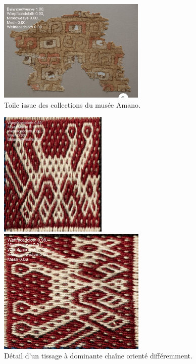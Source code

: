 \begin{figure}[!h]
	\begin{center}
		\includegraphics[width=7cm]{../images/AMANObalancedWeave.png}
		\caption{Toile issue des collections du musée Amano.}
	 \end{center}
\end{figure}

\clearpage

\begin{figure}[!h]
 \begin{minipage}[c]{.5\linewidth}
        \begin{center}
        		\includegraphics[height=6cm]{../images/weave1.jpg}
	\end{center}
    \end{minipage}
            \begin{minipage}[c]{.5\linewidth}
        \begin{center}
        		\includegraphics[height=6cm]{../images/weave1r.jpg}
	\end{center}
    \end{minipage}
    \caption{Détail d'un tissage à dominante chaîne orienté différemment.}
\end{figure}

